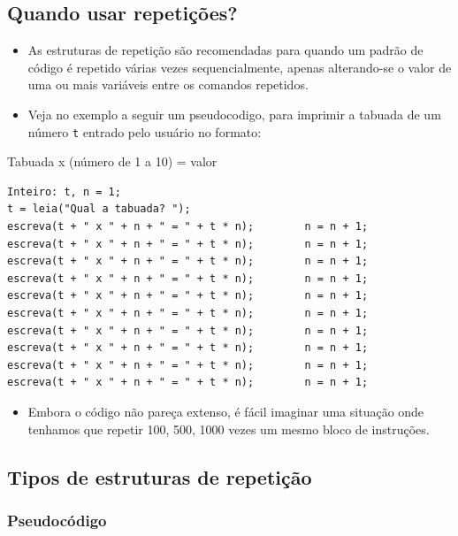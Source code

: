 \documentclass[12pt,a4paper]{article}
\providecommand{\tightlist}{%
      \setlength{\itemsep}{0pt}\setlength{\parskip}{0pt}}
\begin{document}
    \hypertarget{quando-usar-repetiuxe7uxf5es}{%
\subsection{Quando usar
repetições?}\label{quando-usar-repetiuxe7uxf5es}}

    \begin{itemize}
\item
  As estruturas de repetição são recomendadas para quando um padrão de
  código é repetido várias vezes sequencialmente, apenas alterando-se o
  valor de uma ou mais variáveis entre os comandos repetidos.
\item
  Veja no exemplo a seguir um pseudocodigo, para imprimir a tabuada de
  um número \texttt{t} entrado pelo usuário no formato:
\end{itemize}

Tabuada x (número de 1 a 10) = valor

    \begin{verbatim}
Inteiro: t, n = 1;
t = leia("Qual a tabuada? "); 
escreva(t + " x " + n + " = " + t * n);        n = n + 1; 
escreva(t + " x " + n + " = " + t * n);        n = n + 1; 
escreva(t + " x " + n + " = " + t * n);        n = n + 1; 
escreva(t + " x " + n + " = " + t * n);        n = n + 1; 
escreva(t + " x " + n + " = " + t * n);        n = n + 1; 
escreva(t + " x " + n + " = " + t * n);        n = n + 1; 
escreva(t + " x " + n + " = " + t * n);        n = n + 1; 
escreva(t + " x " + n + " = " + t * n);        n = n + 1; 
escreva(t + " x " + n + " = " + t * n);        n = n + 1; 
escreva(t + " x " + n + " = " + t * n);        n = n + 1; 
\end{verbatim}

    \begin{itemize}
\tightlist
\item
  Embora o código não pareça extenso, é fácil imaginar uma situação onde
  tenhamos que repetir 100, 500, 1000 vezes um mesmo bloco de
  instruções.
\end{itemize}

    \hypertarget{tipos-de-estruturas-de-repetiuxe7uxe3o}{%
\subsection{Tipos de estruturas de
repetição}\label{tipos-de-estruturas-de-repetiuxe7uxe3o}}

    \hypertarget{pseudocuxf3digo}{%
\subsubsection{Pseudocódigo}\label{pseudocuxf3digo}}
\end{document}
